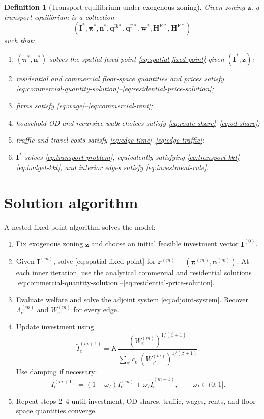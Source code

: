 \documentclass[12pt,a4paper]{article}
\newtheorem{definition}{Definition}
\newcommand{\R}{\mathrm{R}}
\newcommand{\F}{\mathrm{F}}
\newcommand{\1}{\mathbb 1}
\begin{document}
\begin{definition}[Transport equilibrium under exogenous zoning]
Given zoning $\mathbf z$, a transport equilibrium is a collection
\[
\left(
\mathbf I^*,
\boldsymbol\pi^*,
\mathbf n^*,
\mathbf q^{\R*},
\mathbf q^{\F*},
\mathbf w^*,
\mathbf H^{\R*},
\mathbf H^{\F*}
\right)
\]
such that:
\begin{enumerate}
\item $(\boldsymbol\pi^*,\mathbf n^*)$ solves the spatial fixed point \eqref{eq:spatial-fixed-point} given $(\mathbf I^*,\mathbf z)$;
\item residential and commercial floor-space quantities and prices satisfy \eqref{eq:commercial-quantity-solution}--\eqref{eq:residential-price-solution};
\item firms satisfy \eqref{eq:wage}--\eqref{eq:commercial-rent};
\item household OD and recursive-walk choices satisfy \eqref{eq:route-share}--\eqref{eq:od-share};
\item traffic and travel costs satisfy \eqref{eq:edge-time}--\eqref{eq:edge-traffic};
\item $\mathbf I^*$ solves \eqref{eq:transport-problem}, equivalently satisfying \eqref{eq:transport-kkt}--\eqref{eq:budget-kkt}, and interior edges satisfy \eqref{eq:investment-rule}.
\end{enumerate}
\end{definition}

\section{Solution algorithm}

A nested fixed-point algorithm solves the model:
\begin{enumerate}
\item Fix exogenous zoning $\mathbf z$ and choose an initial feasible investment vector $\mathbf I^{(0)}$.
\item Given $\mathbf I^{(m)}$, solve \eqref{eq:spatial-fixed-point} for $x^{(m)}=(\boldsymbol\pi^{(m)},\mathbf n^{(m)})$. At each inner iteration, use the analytical commercial and residential solutions \eqref{eq:commercial-quantity-solution}--\eqref{eq:residential-price-solution}.
\item Evaluate welfare and solve the adjoint system \eqref{eq:adjoint-system}. Recover $\Lambda_e^{(m)}$ and $W_e^{(m)}$ for every edge.
\item Update investment using
\[
\widetilde I_e^{(m+1)}
=
K
\frac{(W_e^{(m)})^{1/(\beta+1)}}
{\sum_{e'}c_{e'}(W_{e'}^{(m)})^{1/(\beta+1)}}.
\]
Use damping if necessary:
\[
I_e^{(m+1)}
=(1-\omega_I)I_e^{(m)}+\omega_I\widetilde I_e^{(m+1)},
\qquad \omega_I\in(0,1].
\]
\item Repeat steps 2--4 until investment, OD shares, traffic, wages, rents, and floor-space quantities converge.
\end{enumerate}
\end{document}
